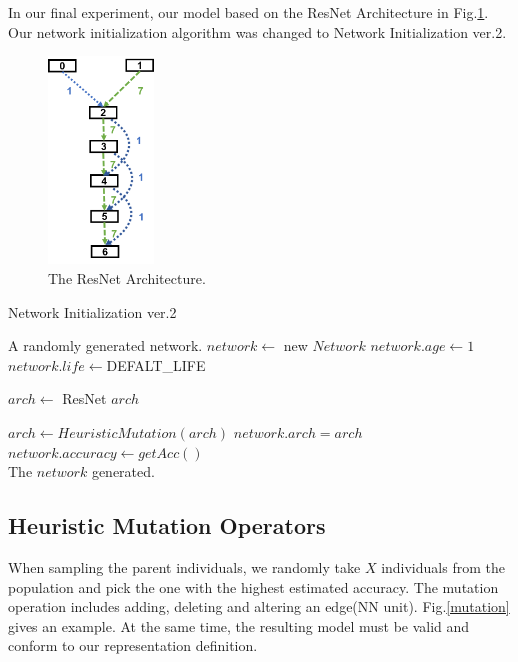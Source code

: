 \documentclass[conference]{IEEEtran}
\begin{document}
In our final experiment, our model based on the ResNet Architecture in Fig.\ref{resnet}. Our network initialization algorithm was changed to Network Initialization ver.2.
\begin{figure}[H]
    \centering
    \includegraphics[width=0.25\textwidth]{figures/fig_resnet.png}
    \caption{The ResNet Architecture\cite{He_2016_CVPR}.}\label{fig:digit}
    \label{resnet}
\end{figure}

 \begin{algorithm}[H]  
    \caption{ Network Initialization ver.2}
    
    
    \begin{algorithmic}[1]  
        \Ensure A randomly generated network.
        \State $network\gets $ new $Network$
        \State $network.age\gets1$
        \State $network.life\gets $DEFALT\_LIFE 
        
        \State $arch\gets $ ResNet $ arch$ 
        
        \State $arch\gets HeuristicMutation(arch)$
        \State $network.arch=arch$
        \State $network.accuracy\gets getAcc()$
        \\
        \Return The $network$ generated.
        
    \end{algorithmic}  
\end{algorithm}  

  \subsection{Heuristic Mutation Operators}
  When sampling the parent individuals, we randomly take $X$ individuals from the population and pick the one with the highest estimated accuracy. The mutation operation includes adding, deleting and altering an edge(NN unit). Fig.\ref{mutation} gives an example. At the same time, the resulting model must be valid and conform to our representation definition. 
\end{document}
